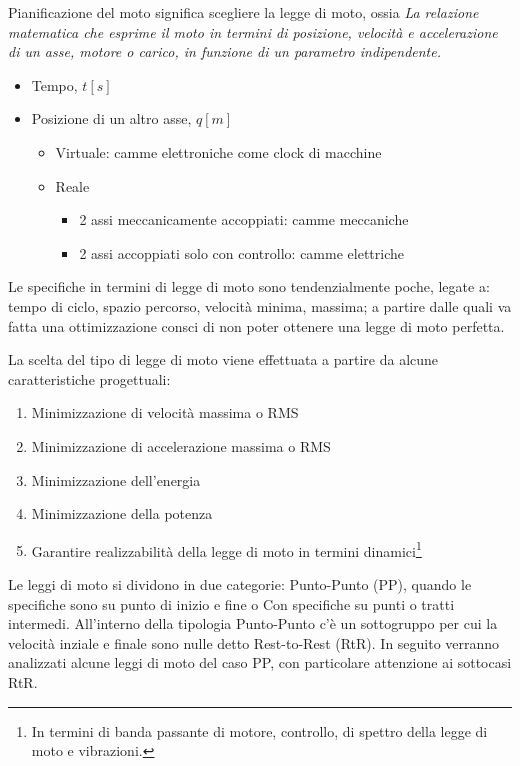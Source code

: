 Pianificazione del moto significa scegliere la legge di moto, ossia \textit{La relazione matematica che esprime il moto in termini di posizione, velocità e accelerazione di un asse, motore o carico, in funzione di un parametro indipendente.}
\begin{itemize}
    \item Tempo, \(t [s]\)
    \item Posizione di un altro asse, \(q [m]\)
    \begin{itemize}
        \item Virtuale: camme elettroniche come clock di macchine
        \item Reale
        \begin{itemize}
            \item 2 assi meccanicamente accoppiati: camme meccaniche
            \item 2 assi accoppiati solo con controllo: camme elettriche
        \end{itemize}
    \end{itemize}
\end{itemize}

Le specifiche in termini di legge di moto sono tendenzialmente poche, legate a: tempo di ciclo, spazio percorso, velocità minima, massima; a partire dalle quali va fatta una ottimizzazione consci di non poter ottenere una legge di moto perfetta.

La scelta del tipo di legge di moto viene effettuata a partire da alcune caratteristiche progettuali:
\begin{enumerate}
    \item Minimizzazione di velocità massima o RMS
    \item Minimizzazione di accelerazione massima o RMS
    \item Minimizzazione dell'energia
    \item Minimizzazione della potenza
    \item Garantire realizzabilità della legge di moto in termini dinamici\footnote{In termini di banda passante di motore, controllo, di spettro della legge di moto e vibrazioni.}
\end{enumerate}

Le leggi di moto si dividono in due categorie: Punto-Punto (PP), quando le specifiche sono su punto di inizio e fine o Con specifiche su punti o tratti intermedi.
All'interno della tipologia Punto-Punto c'è un sottogruppo per cui la velocità inziale e finale sono nulle detto Rest-to-Rest (RtR).
In seguito verranno analizzati alcune leggi di moto del caso PP, con particolare attenzione ai sottocasi RtR.

